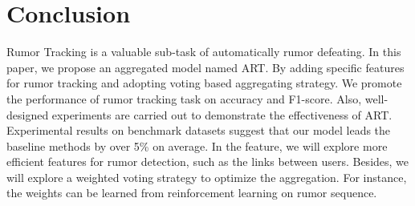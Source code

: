 \section{Conclusion}
\label{sec:conclusion}
Rumor Tracking is a valuable sub-task of automatically rumor defeating. In this paper, we propose an aggregated model named ART.  By adding specific features for rumor tracking and adopting voting based aggregating strategy. We promote the performance of rumor tracking task on accuracy and F1-score. Also, well-designed experiments are carried out to demonstrate the effectiveness of ART. Experimental results on benchmark datasets suggest that our model leads the baseline methods by over 5\% on average. In the feature, we will explore more efficient features for rumor detection, such as the links between users. Besides, we will explore a weighted voting strategy to optimize the aggregation. For instance, the weights can be learned from reinforcement learning on rumor sequence.